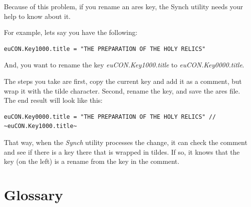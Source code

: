 \documentclass[]{memoir}
\begin{document}
Because of this problem, if you rename an ares key, the Synch utility needs your help to know about it.

For example, lets say you have the following:

\begin{verbatim}
euCON.Key1000.title = "THE PREPARATION OF THE HOLY RELICS"    
\end{verbatim}

And, you want to rename the key \emph{euCON.Key1000.title} to \emph{euCON.Key0000.title}.

The steps you take are first, copy the current key and add it as a comment, but wrap it with the tilde character.  Second, rename the key, and save the ares file.  The end result will look like this:

\begin{verbatim}
euCON.Key0000.title = "THE PREPARATION OF THE HOLY RELICS" // ~euCON.Key1000.title~    
\end{verbatim}

That way, when the \emph{Synch} utility processes the change, it can check the comment and see if there is a key there that is wrapped in tildes.  If so, it knows that the key (on the left) is a rename from the key in the comment.  

\vfill



\fancyhead[L]{\textsf{\rightmark}} %
\fancyhead[R]{\textsf{\leftmark}} %
\renewcommand{\headrulewidth}{1.4pt} %
\fancyfoot[C]{\textbf{\textsf{\thepage}}} %
\renewcommand{\footrulewidth}{1.4pt} %
\pagestyle{fancy} %

\newcommand{\entry}[4]{\markboth{#1}{#1}\textbf{#1}\ {(#2)}\ \textit{#3}\ $\bullet$\ {#4}}  %

\setlength{\parskip}{5pt}\chapter{Glossary}
\end{document}
